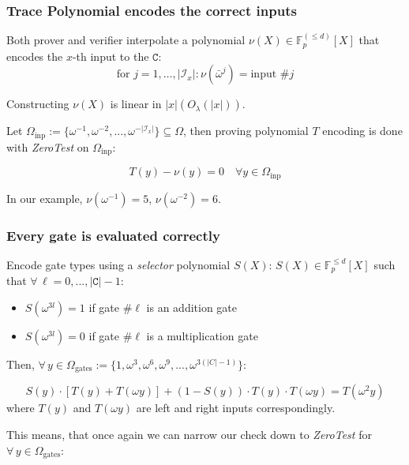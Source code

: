 \documentclass[../lecture-notes.tex]{subfiles}
\begin{document}
\subsubsection{Trace Polynomial encodes the correct inputs}
Both prover and verifier interpolate a polynomial \(\nu(X) \in \mathbb{F}_p^{(\leq d)}[X] \) that encodes the \(x\)-th input to the \(\texttt{C}\):
\[\text{for } j = 1, \dots, |\mathcal{I}_x| : \nu(\bar{\omega}^j) = \text{input } \#j\]

\begin{remark}
Constructing \(\nu(X)\) is linear in \(|x| \left( O_\lambda(|x|) \right)\).
\end{remark}

Let \(\Omega_{\text{inp}} := \{ \omega^{-1}, \omega^{-2}, ..., \omega^{-|\mathcal{I}_x|} \} \subseteq \Omega\), then proving polynomial \(T\) encoding is done with \textit{ZeroTest} on \(\Omega_{\text{inp}}\):

\[T(y) - \nu(y) = 0 \quad \forall y \in \Omega_{\text{inp}}\]

\begin{example}
In our example, \(\nu(\omega^{-1})=5\), \(\nu(\omega^{-2})=6\).
\end{example}

\subsubsection{Every gate is evaluated correctly}

Encode gate types using a \textit{selector} polynomial \(S(X)\):
\(S(X) \in \mathbb{F}_p^{\leq d}[X]\) such that \(\forall \, \ell = 0, ..., |\texttt{C}| - 1\): 
\begin{itemize}
    \item \(S(\omega^{3l}) = 1\) if gate \(\# \ell\) is an addition gate 
    \item \(S(\omega^{3l}) = 0\) if gate \(\# \ell\) is a multiplication gate 
\end{itemize}

Then, \(\forall \, y \in \Omega_{\text{gates}} := \{ 1, \omega^3, \omega^6, \omega^9, ..., \omega^{3(|C|-1)} \}\):

\[S(y) \cdot [T(y) + T(\omega y)] + (1 - S(y)) \cdot T(y) \cdot T(\omega y) = T(\omega^2 y)\]
where \(T(y)\) and \(T(\omega y)\) are left and right inputs correspondingly.

This means, that once again we can narrow our check down to \textit{ZeroTest} for \(\forall \, y \in \Omega_{\text{gates}}\):
\end{document}
